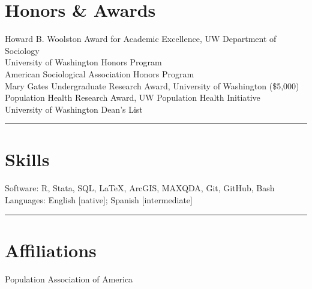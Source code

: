 \documentclass[11pt]{article} %
\begin{document}
\section*{Honors \& Awards}
 Howard B. Woolston Award for Academic Excellence, UW Department of Sociology \\
 University of Washington Honors Program \\
 American Sociological Association Honors Program \\
 Mary Gates Undergraduate Research Award, University of Washington (\$5,000)	\\	
 Population Health Research Award, UW Population Health Initiative 	\\
 University of Washington Dean’s List \\					     
\noindent\rule{16cm}{0.4pt}

\section*{Skills}

Software: R, Stata, SQL, \LaTeX, ArcGIS, MAXQDA, Git, GitHub, Bash \\
Languages: English [native]; Spanish [intermediate] \\
\noindent\rule{16cm}{0.4pt}

\section*{Affiliations} 
Population Association of America
\end{document}
